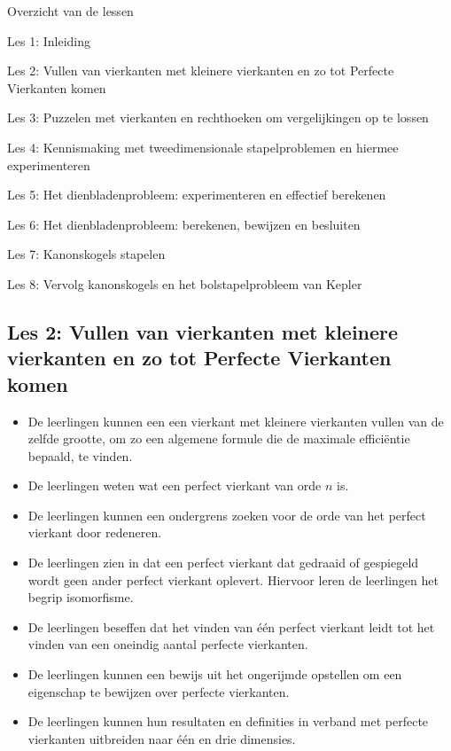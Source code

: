 \documentclass[dutch]{beamer}
\begin{document}
\begin{frame}
{Overzicht van de lessen}
\begin{list}{\quad}{}
\item Les 1: Inleiding
\item {\color{blue}Les 2: Vullen van vierkanten met kleinere vierkanten en zo tot Perfecte Vierkanten komen}
\item Les 3: Puzzelen met vierkanten en rechthoeken om vergelijkingen op te lossen
\item Les 4: Kennismaking met tweedimensionale stapelproblemen en hiermee experimenteren
\item Les 5: Het dienbladenprobleem: experimenteren en effectief berekenen
\item Les 6: Het dienbladenprobleem: berekenen, bewijzen en besluiten
\item Les 7: Kanonskogels stapelen
\item Les 8: Vervolg kanonskogels en het bolstapelprobleem van Kepler
\end{list}
\end{frame}

\subsection{Les 2: Vullen van vierkanten met kleinere vierkanten en zo tot Perfecte Vierkanten komen}

\begin{frame}
\begin{itemize}
\item De leerlingen kunnen een een vierkant met kleinere vierkanten vullen van de zelfde grootte, om zo een algemene formule die de maximale effici\"{e}ntie bepaald, te vinden.
\item De leerlingen weten wat een perfect vierkant van orde $n$ is.
\item De leerlingen kunnen een ondergrens zoeken voor de orde van het perfect vierkant door redeneren.
\item De leerlingen zien in dat een perfect vierkant dat gedraaid of gespiegeld wordt geen ander perfect vierkant oplevert. Hiervoor leren de leerlingen het begrip isomorfisme.
\item De leerlingen beseffen dat het vinden van \'{e}\'{e}n perfect vierkant leidt tot het vinden van een oneindig aantal perfecte vierkanten. 
\item De leerlingen kunnen een bewijs uit het ongerijmde opstellen om een eigenschap te bewijzen over perfecte vierkanten.
\item De leerlingen kunnen hun resultaten en definities in verband met perfecte vierkanten uitbreiden naar \'{e}\'{e}n en drie dimensies.
\end{itemize}
\end{frame}
\end{document}

